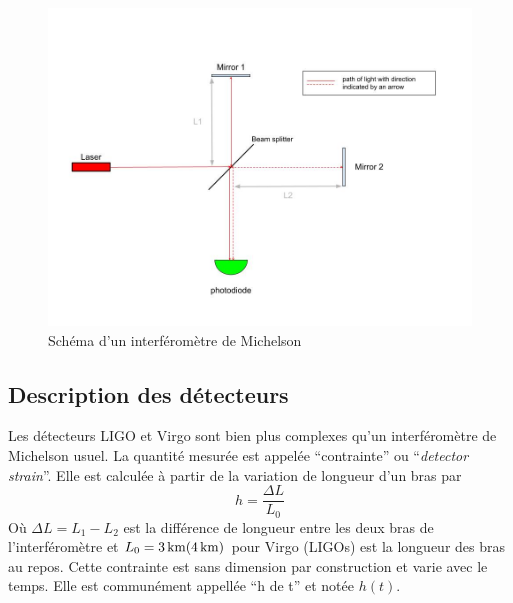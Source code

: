 %
\begin{figure}
  \centering
  \includegraphics[width=0.8\linewidth]{sectionDetection/michelson.jpg}
  \caption{Schéma d'un interféromètre de Michelson}
  \label{fig:michelson}
\end{figure}


\subsection{Description des détecteurs}
\label{sec:detector}

Les détecteurs LIGO et Virgo sont bien plus complexes qu'un interféromètre de Michelson usuel.
La quantité mesurée est appelée ``contrainte'' ou ``\textit{detector strain}''.
Elle est calculée à partir de la variation de longueur d'un bras par
\begin{equation}
  h = \frac{\Delta L}{L_0}
\end{equation}
Où $\Delta L = L_1-L_2$ est la différence de longueur entre les deux bras de l'interféromètre et $L_0 = \textrm{\SI{3}{km}} (\textrm{\SI{4}{km}})$ pour Virgo (LIGOs) est la longueur des bras au repos.
Cette contrainte est sans dimension par construction et varie avec le temps.
Elle est communément appellée ``h de t'' et notée $h(t)$.

